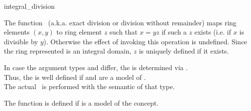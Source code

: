 \begin{ccRefFunction}{integral_division}

\ccDefinition

The function \ccRefName\ (a.k.a. exact division or division without remainder) 
maps ring elements $(x,y)$ to ring element $z$ such that $x = yz$ if such a $z$ 
exists (i.e. if $x$ is divisible by $y$). Otherwise the effect of invoking 
this operation is undefined. Since the ring represented is an integral domain, 
$z$ is uniquely defined if it exists. 

In case the argument types  and  differ, 
the  is determined via .\\
Thus, the  is well defined if  and  
are a model of . \\
The actual \ccRefName\ is performed with the semantic of that type.

The function is defined if 
is a model of the  concept.



\ccSeeAlso

\\
\\

\end{ccRefFunction}

